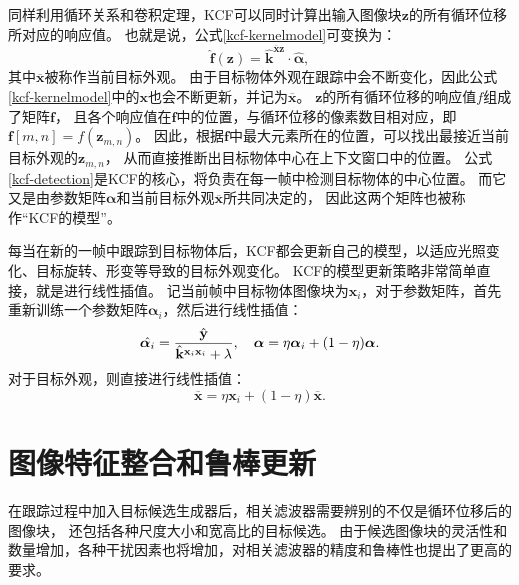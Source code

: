 同样利用循环关系和卷积定理，KCF可以同时计算出输入图像块$\mathbf{z}$的所有循环位移所对应的响应值。
也就是说，公式\ref{kcf-kernelmodel}可变换为：
\begin{equation}
	\hat{\mathbf{f}}(\mathbf{z})=\hat{\mathbf{k}}^{\overline{\mathbf{x}}\mathbf{z}}\cdot\hat{\boldsymbol{\alpha}},\label{kcf-detection}
\end{equation}
其中$\overline{\mathbf{x}}$被称作当前目标外观。
由于目标物体外观在跟踪中会不断变化，因此公式\ref{kcf-kernelmodel}中的$\mathbf{x}$也会不断更新，并记为$\overline{\mathbf{x}}$。
$\mathbf{z}$的所有循环位移的响应值$f$组成了矩阵$\mathbf{f}$，
且各个响应值在$\mathbf{f}$中的位置，与循环位移的像素数目相对应，即$\mathbf{f}[m,n]=f(\mathbf{z}_{m,n})$。
因此，根据$\mathbf{f}$中最大元素所在的位置，可以找出最接近当前目标外观的$\mathbf{z}_{m,n}$，
从而直接推断出目标物体中心在上下文窗口中的位置。
公式\ref{kcf-detection}是KCF的核心，将负责在每一帧中检测目标物体的中心位置。
而它又是由参数矩阵$\boldsymbol{\alpha}$和当前目标外观$\overline{\mathbf{x}}$所共同决定的，
因此这两个矩阵也被称作``KCF的模型''。

每当在新的一帧中跟踪到目标物体后，KCF都会更新自己的模型，以适应光照变化、目标旋转、形变等导致的目标外观变化。
KCF的模型更新策略非常简单直接，就是进行线性插值。
记当前帧中目标物体图像块为$\mathbf{x}_i$，对于参数矩阵，首先重新训练一个参数矩阵$\boldsymbol{\alpha}_i$，然后进行线性插值：
\begin{equation}
	\hat{\boldsymbol{\alpha}_i}=\frac{\hat{\mathbf{y}}}{\hat{\mathbf{k}}{}^{\mathbf{x}_i\mathbf{x}_i}+\lambda}, \\ \ \ \ 
	\boldsymbol{\alpha}=\eta{\boldsymbol{\alpha}_i} + ( 1-\eta )\boldsymbol{\alpha}.
	\label{kcf_learning2}
\end{equation}
对于目标外观，则直接进行线性插值：
\begin{equation}
\overline{\mathbf{x}}=\eta\mathbf{x}_i+(1-\eta)\overline{\mathbf{x}}.
\label{kcf_appearlearning}
\end{equation}


\section{图像特征整合和鲁棒更新}
\label{featureintegrasec}
在跟踪过程中加入目标候选生成器后，相关滤波器需要辨别的不仅是循环位移后的图像块，
还包括各种尺度大小和宽高比的目标候选。
由于候选图像块的灵活性和数量增加，各种干扰因素也将增加，对相关滤波器的精度和鲁棒性也提出了更高的要求。

